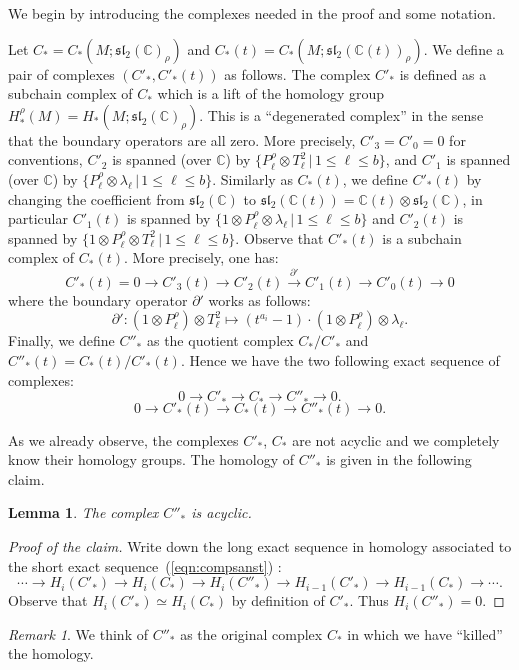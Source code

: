\documentclass[a4paper]{amsart}
\theoremstyle{plain}
\newtheorem{lemma}[theorem]{Lemma}%
\theoremstyle{definition}
\theoremstyle{remark}
\newtheorem{remark}{Remark}%
\newcommand{\myleq}{\leqslant}
\newcommand{\CC}{{\mathbb C}}
\newcommand{\sll}{\mathfrak{sl}_2(\CC)}
\newcommand{\sllrho}{\mathfrak{sl}_2(\CC)_\rho}
\newcommand{\sllt}{\mathfrak{sl}_2(\CC(t))}
\newcommand{\sllrhot}{\mathfrak{sl}_2(\CC(t))_\rho}
\begin{document}
We begin by introducing the complexes needed in the proof and some
notation. 

Let $C_* = C_*(M; \sllrho)$ and $C_*(t) = C_*(M; \sllrhot)$.  We
define a pair of complexes $(C'_*, C'_*(t))$ as follows.  The complex
$C'_*$ is defined as a subchain complex of $C_*$ which is a lift of
the homology group $H^\rho_*(M) = H_*(M; \sllrho)$.  This is a
``degenerated complex'' in the sense that the boundary operators are
all zero.  More precisely, $C'_3 = C'_0 = 0$ for conventions, $C'_2$
is spanned (over $\CC$) by 
$\{ P^\rho_\ell \otimes T^2_\ell \,|\, 1 \myleq \ell \myleq b \}$, 
and $C'_1$ is spanned (over $\CC$)
by 
$\{P^\rho_\ell \otimes \lambda_\ell \,|\, 1 \myleq \ell \myleq b \}$.  
Similarly as $C_*(t)$, we define $C'_*(t)$ by changing the coefficient from $\sll$
to $\sllt = \CC(t) \otimes \sll$, in particular
$C'_1(t)$ is spanned by 
$\{1 \otimes P^\rho_\ell \otimes \lambda_\ell \,|\, 1 \myleq \ell \myleq b \}$ and $C'_2(t)$ is spanned by 
$\{1 \otimes P^\rho_\ell \otimes T^2_\ell \,|\, 1 \myleq \ell \myleq b \}$.  
Observe that
$C'_*(t)$ is a subchain complex of $C_*(t)$.  More precisely, one has:
\begin{equation}\label{eqn:c'(t)}
  C'_*(t) = 
    0 \to 
    C'_3(t) \to C'_2(t) \xrightarrow{\partial'} 
    C'_1(t) \to C'_0(t) \to
    0
\end{equation}
where the boundary operator $\partial'$ works as follows:
$$
  \partial' \colon (1 \otimes P^\rho_\ell) \otimes T^2_\ell
  \mapsto (t^{a_i} - 1) \cdot (1 \otimes P^\rho_\ell) \otimes
    \lambda_\ell.
$$ 
Finally, we define $C''_*$ as the quotient complex $C_* / C'_*$ and
$C''_*(t) = C_*(t) / C'_*(t)$.  Hence we have the two following exact
sequence of complexes:
\begin{equation}\label{eqn:compsanst}
  0 \to C'_* \to C_* \to C''_* \to 0.
\end{equation}
\begin{equation}\label{eqn:comp}
  0 \to C'_*(t) \to C_*(t) \to C''_*(t) \to 0.
\end{equation}

As we already observe, the complexes $C'_*$, $C_*$ are not acyclic and
we completely know their homology groups.  The homology of $C''_*$ is
given in the following claim.
\begin{lemma}
  The complex $C''_*$ is acyclic.
\end{lemma}
\begin{proof}[Proof of the claim]
  Write down the long exact sequence in homology associated to the
  short exact sequence~(\ref{eqn:compsanst}) :
  \[
   \cdots \to H_i(C'_*) \to H_i(C_*) \to
    H_i(C''_*) \to H_{i-1}(C'_*) \to H_{i-1}(C_*) \to
    \cdots.
  \]
  Observe that $H_i(C'_*) \simeq H_i(C_*)$ by definition of $C'_*$.
  Thus $H_i(C''_*) = 0$.
\end{proof}
\begin{remark}
  We think of $C''_*$ as the original complex $C_*$ in which we have
  ``killed'' the homology.
\end{remark}
\end{document}
